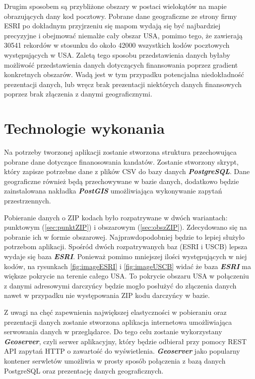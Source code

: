 \documentclass[10pt,a4paper]{article}
\begin{document}
Drugim sposobem są przybliżone obszary w postaci wielokątów na mapie obrazujących dany kod pocztowy. Pobrane dane geograficzne ze strony firmy ESRI po dokładnym przyjrzeniu się mapom wydają się być najbardziej precyzyjne i obejmować niemalże cały obszar USA, pomimo tego, że zawierają 30541 rekordów w stosunku do około 42000 wszystkich kodów pocztowych występujących w USA. Zaletą tego sposobu przedstawienia danych byłaby możliwość przedstawienia danych dotyczących finansowania poprzez gradient konkretnych obszarów. Wadą jest w tym przypadku potencjalna niedokładność prezentacji danych, lub wręcz brak prezentacji niektórych danych finansowych poprzez brak złączenia z danymi geograficznymi.

\section{Technologie wykonania}

Na potrzeby tworzonej aplikacji zostanie stworzona struktura przechowująca pobrane dane dotyczące finanosowania kandatów. Zostanie stworzony skrypt, który zapisze potrzebne dane z plików CSV do bazy danych \textit{\textbf{PostgreSQL}}. Dane geograficzne również będą przechowywane w bazie danych, dodatkowo będzie zainstalowana nakładka \textit{\textbf{PostGIS}} umożliwiająca wykonywanie zapytań przestrzennych.

Pobieranie danych o ZIP kodach było rozpatrywane w dwóch wariantach: punktowym (\ref*{sec:punktZIP}) i obszarowym (\ref*{sec:obszZIP}). Zdecydowano się na pobranie ich w formie obszarowej. Najprawdopodobniej będzie to lepiej służyło potrzebom aplikacji. Spośród dwóch rozpatrywanych baz (ESRI i USCB) lepsza wydaje się baza \textit{\textbf{ESRI}}. Ponieważ pomimo mniejszej ilości występujących w niej kodów, na rysunkach \ref{fig:imageESRI} i \ref{fig:imageUSCB} widać że baza \textit{\textbf{ESRI}} ma większe pokrycie na terenie całego USA. To pokrycie obszaru USA w połączeniu z danymi adresowymi darczyńcy będzie mogło posłużyć do złączenia danych nawet w przypadku nie występowania ZIP kodu darczyńcy w bazie.  

Z uwagi na chęć zapewnienia największej elastyczności w pobieraniu oraz prezentacji danych zostanie stworzona aplikacja internetowa umożliwiająca serwowania danych w przeglądarce. Do tego celu zostanie wykorzystany \textit{\textbf{Geoserver}}, czyli serwer aplikacyjny, który będzie odbierał przy pomocy REST API zapytań HTTP o zawartość do wyświetlenia. \textit{\textbf{Geoserver}} jako popularny kontener serwletów umożliwia w prosty sposób połączenia z bazą danych PostgreSQL oraz prezentację danych geograficznych.
\end{document}

